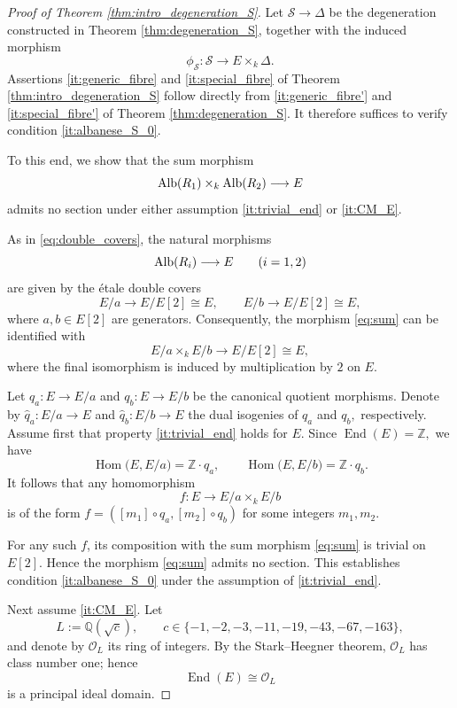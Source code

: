 \documentclass[11pt,letterpaper]{amsart}
\newcommand{\Alb}{\textnormal{Alb}}
\newcommand{\ca}[1]{{\mathcal{#1}}}
\numberwithin{equation}{section}
\theoremstyle{definition}
\theoremstyle{remark}
\newcommand{\Q}{\mathbb{Q}}
\newcommand{\Z}{\mathbb{Z}}
\DeclareMathOperator{\End}{End}
\DeclareMathOperator{\Hom}{Hom}
\begin{document}
\begin{proof}[Proof of Theorem \ref{thm:intro_degeneration_S}] Let $\ca S\to\Delta$ be the degeneration constructed in Theorem \ref{thm:degeneration_S}, together with the induced morphism $$\phi_{\ca S}\colon \ca S\longrightarrow E\times_k\Delta.$$ Assertions \eqref{it:generic_fibre} and \eqref{it:special_fibre} of Theorem \ref{thm:intro_degeneration_S} follow directly from \eqref{it:generic_fibre'} and \eqref{it:special_fibre'} of Theorem \ref{thm:degeneration_S}. It therefore suffices to verify condition \eqref{it:albanese_S_0}.\par
To this end, we show that the sum morphism \begin{equation}\label{eq:sum}
    \Alb(R_{1})\times_k\Alb(R_{2})\longrightarrow E\end{equation}
admits no section under either assumption \ref{it:trivial_end} or \ref{it:CM_E}.\par
As in \eqref{eq:double_covers}, the natural morphisms $$ \Alb(R_{i})\longrightarrow E\qquad (i=1,2)$$ are given by the \'etale double covers 
$$E/a\longrightarrow E/E[2]\cong E,\qquad E/b\longrightarrow E/E[2]\cong E,$$
where $a,b\in E[2]$ are generators. Consequently, the morphism \eqref{eq:sum} can be identified with
$$E/a\times_k E/b\longrightarrow E/E[2]\cong E,$$
where the final isomorphism is induced by multiplication by $2$ on $E$.\par
Let $q_a\colon E\to E/a$ and $q_{b}\colon E\to E/b$ be the canonical quotient morphisms. Denote by $\hat{q}_a\colon E/a\to E$ and $\hat{q}_b\colon E/b\to E$ the dual isogenies of $q_a$ and $q_b,$ respectively. Assume first that property \ref{it:trivial_end} holds for $E$. Since $\End(E)=\Z,$ we have $$\Hom\bigl(E,E/a\bigr)=\Z\cdot q_a,\qquad \Hom\bigl(E,E/b\bigr)=\Z\cdot q_b .$$ It follows that any homomorphism $$f\colon E\longrightarrow E/a\times_{k} E/b$$ is of the form $f=([m_1]\circ q_a,[m_2]\circ q_b)$ for some integers $m_1,m_2$.\par
For any such $f$, its composition with the sum morphism \eqref{eq:sum} is trivial on $E[2].$ Hence the morphism \eqref{eq:sum} admits no section. This establishes condition \eqref{it:albanese_S_0} under the assumption of \ref{it:trivial_end}.\par
Next assume \ref{it:CM_E}. Let $$L:=\Q(\sqrt{c}), \qquad c\in\{-1,-2,-3,-11,-19,-43,-67,-163\},$$ and denote by $\mathcal O_{L}$ its ring of integers. By the Stark--Heegner theorem, $\mathcal{O}_L$ has class number one; hence $$\End(E)\cong\mathcal O_{L}$$ is a principal ideal domain.\par

\end{proof}
\end{document}
